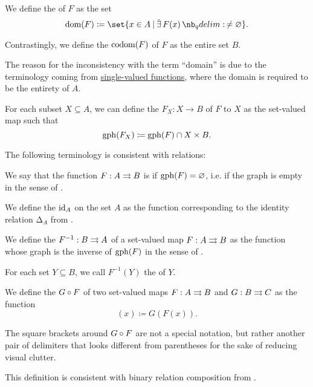 \begin{definition}
\begin{thmenum}[series=def:set_valued_map]
     We define the  of \( F \) as the set
    \begin{equation*}
      \dom(F) \coloneqq \set{ x \in A \given \qexists{F(x)} \neq \varnothing }.
    \end{equation*}

     Contrastingly, we define the  \( \operatorname*{co\negthinspace\operatorname{dom}}(F) \) of \( F \) as the entire set \( B \).

    The reason for the inconsistency with the term \enquote{domain} is due to the terminology coming from \hyperref[def:function]{single-valued functions}, where the domain is required to be the entirety of \( A \).

     For each subset \( X \subseteq A \), we can define the  \( F_X: X \to B \) of \( F \) to \( X \) as the set-valued map such that
    \begin{equation*}
      \operatorname{gph}(F_X) \coloneqq \operatorname{gph}(F) \cap X \times B.
    \end{equation*}
  \end{thmenum}

  The following terminology is consistent with relations:
  \begin{thmenum}[resume=def:set_valued_map]
     We say that the function \( F: A \rightrightarrows B \) is  if \( \operatorname{gph}(F) = \varnothing \), i.e. if the graph is empty in the sense of .

     We define the  \( \operatorname{id}_A \) on the set \( A \) as the function corresponding to the identity relation \( \increment_A \) from .

     We define the  \( F^{-1}: B \rightrightarrows A \) of a set-valued map \( F: A \rightrightarrows B \) as the function whose graph is the inverse of \( \operatorname{gph}(F) \) in the sense of .

    For each set \( Y \subseteq B \), we call \( F^{-1}(Y) \) the  of \( Y \).

     We define the  \( G \bincirc F \) of two set-valued maps \( F: A \rightrightarrows B \) and \( G: B \rightrightarrows C \) as the function
    \begin{equation*}
      [G \bincirc F](x) \coloneqq G(F(x)).
    \end{equation*}

    The square brackets around \( G \bincirc F \) are not a special notation, but rather another pair of delimiters that looks different from parentheses for the sake of reducing visual clutter.

    This definition is consistent with binary relation composition from .
  \end{thmenum}
\end{definition}
